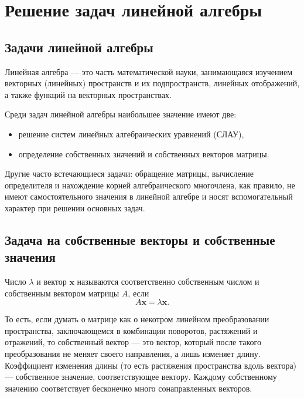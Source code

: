 \section{Решение задач линейной алгебры}


\subsection{Задачи линейной алгебры}

Линейная алгебра — это часть математической науки, занимающаяся изучением
векторных (линейных) пространств и их подпространств, линейных отображений,
а также функций на векторных пространствах.

Среди задач линейной алгебры наибольшее значение имеют две:
\begin{itemize}
\item решение систем линейных алгебраических уравнений (СЛАУ),
\item определение собственных значений и собственных векторов матрицы.
\end{itemize}
Другие часто встечающиеся задачи: обращение матрицы, вычисление определителя
и нахождение корней алгебраического многочлена, как правило, не имеют
самостоятельного значения в линейной алгебре и носят вспомогательный
характер при решении основных задач.


\subsection{Задача на собственные векторы и собственные значения}

Число $\lambda$ и вектор $\mathbf{x}$ называются соответственно
собственным числом и собственным вектором матрицы $A$, если
\[
A\mathbf{x}=\lambda\mathbf{x}.
\]


То есть, если думать о матрице как о некотром линейном преобразовании
пространства, заключающемся в комбинации поворотов, растяжений и отражений,
то собственный вектор — это вектор, который после такого преобразования
не меняет своего направления, а лишь изменяет длину. Коэффициент изменения
длины (то есть растяжения пространства вдоль вектора) — собственное
значение, соответствующее вектору. Каждому собственному значению соответствует
бесконечно много сонаправленных векторов.

